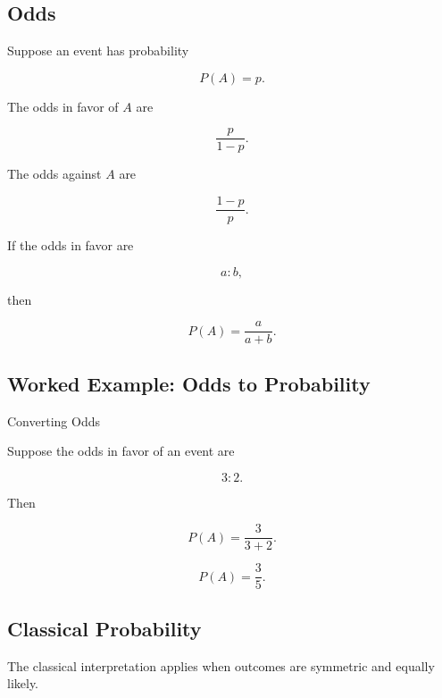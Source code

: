 \subsection{Odds}
\label{subsec:probability-odds}

Suppose an event has probability

\[
P(A)=p.
\]

The odds in favor of \(A\) are

\[
\boxed{
\frac{p}{1-p}.
}
\]

The odds against \(A\) are

\[
\boxed{
\frac{1-p}{p}.
}
\]

If the odds in favor are

\[
a:b,
\]

then

\[
\boxed{
P(A)
=
\frac{a}{a+b}.
}
\]

\subsection{Worked Example: Odds to Probability}
\label{subsec:worked-odds}

\begin{workedexamplebox}{Converting Odds}

Suppose the odds in favor of an event are

\[
3:2.
\]

Then

\[
P(A)
=
\frac{3}{3+2}.
\]

\begin{answerbox}
\[
\boxed{
P(A)=\frac35.
}
\]
\end{answerbox}

\end{workedexamplebox}

\subsection{Classical Probability}
\label{subsec:classical-probability}

The classical interpretation applies when outcomes are symmetric and
equally likely.

